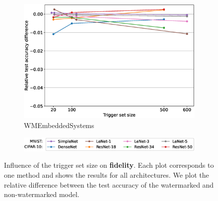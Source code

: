 \begin{figure}
\begin{subfigure}{0.4\linewidth}
        \includegraphics[width=\linewidth]{images/fidelity/WMEmbeddedSystems_fidelity_rel_per_method.eps}
        \caption{WMEmbeddedSystems}
        \label{fig:fidelity-embedded}
    \end{subfigure}
    \quad

    \begin{subfigure}{\linewidth}
    \centering
    \includegraphics[width=0.7\linewidth]{images/fidelity/legend_fidelity_rel_per_method.eps}
    \end{subfigure}
    
    \caption{Influence of the trigger set size on \textbf{fidelity}. Each plot corresponds to one method and shows the results for all architectures. We plot the relative difference between the test accuracy of the watermarked and non-watermarked model.}
    \label{fig:fidelity-per-method}
\end{figure}
